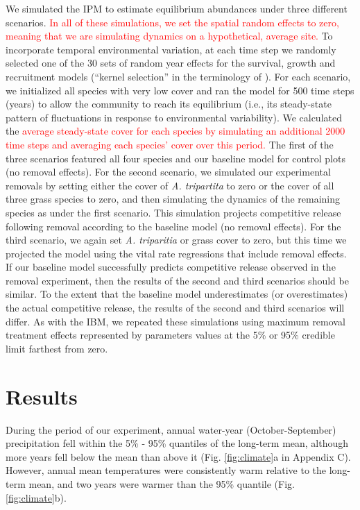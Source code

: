 \documentclass[11pt]{article}
\newcommand{\new}{\textcolor{red}}
\begin{document}
\begin{doublespacing}
We simulated the IPM to estimate equilibrium abundances under three different scenarios. \new{In all of these simulations, we set the spatial random effects to zero, meaning that we are simulating dynamics on a hypothetical, average site.} To incorporate temporal environmental variation, at each time step we randomly selected one of the 30 sets of random year effects for the survival, growth and recruitment models (``kernel selection'' in the terminology of \citealt{metcalf_statistical_2015}). For each scenario, we initialized all species with very low cover and ran the model for 500 time steps (years) to allow the community to reach its equilibrium (i.e., its steady-state pattern of fluctuations in response to environmental variability). We calculated the \new{average steady-state cover for each species by simulating an additional 2000 time steps and averaging each species' cover over this period.} The first of the three scenarios featured all four species and our baseline model for control plots (no removal effects). For the second scenario, we simulated our experimental removals by setting either the cover of \textit{A. tripartita} to zero or the cover of all three grass species to zero, and then simulating the dynamics of the remaining species as under the first scenario. This simulation projects competitive release following removal according to the baseline model (no removal effects). For the third scenario, we again set \textit{A. triparitia} or grass cover to zero, but this time we projected the model using the vital rate regressions that include removal effects. If our baseline model successfully predicts competitive release observed in the removal experiment, then the results of the second and third scenarios should be similar. To the extent that the baseline model underestimates (or overestimates) the actual competitive release, the results of the second and third scenarios will differ. As with the IBM, we repeated these simulations using maximum removal treatment effects represented by parameters values at the 5\% or 95\% credible limit farthest from zero. 

\section*{Results}

During the period of our experiment, annual water-year (October-September) precipitation fell within the 5\% - 95\% quantiles of the 
long-term mean, although more years fell below the mean than above it (Fig. \ref{fig:climate}a in Appendix C). However, annual mean temperatures 
were consistently warm relative to the long-term mean, and two years were warmer than the 95\% quantile (Fig. \ref{fig:climate}b).  


\end{doublespacing}
\end{document}
